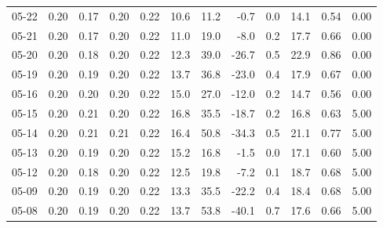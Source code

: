 \begin{threeparttable}
{\begin{tabular}{lrrrrrrrrrrr}
  05-22 &          0.20 &          0.17 &          0.20 &        0.22 &                10.6 &                11.2 &       -0.7 &                 0.0 &             14.1 &            0.54 &                   0.00 \\
  05-21 &          0.20 &          0.17 &          0.20 &        0.22 &                11.0 &                19.0 &       -8.0 &                 0.2 &             17.7 &            0.66 &                   0.00 \\
  05-20 &          0.20 &          0.18 &          0.20 &        0.22 &                12.3 &                39.0 &      -26.7 &                 0.5 &             22.9 &            0.86 &                   0.00 \\
  05-19 &          0.20 &          0.19 &          0.20 &        0.22 &                13.7 &                36.8 &      -23.0 &                 0.4 &             17.9 &            0.67 &                   0.00 \\
  05-16 &          0.20 &          0.20 &          0.20 &        0.22 &                15.0 &                27.0 &      -12.0 &                 0.2 &             14.7 &            0.56 &                   0.00 \\
  05-15 &          0.20 &          0.21 &          0.20 &        0.22 &                16.8 &                35.5 &      -18.7 &                 0.2 &             16.8 &            0.63 &                   5.00 \\
  05-14 &          0.20 &          0.21 &          0.21 &        0.22 &                16.4 &                50.8 &      -34.3 &                 0.5 &             21.1 &            0.77 &                   5.00 \\
  05-13 &          0.20 &          0.19 &          0.20 &        0.22 &                15.2 &                16.8 &       -1.5 &                 0.0 &             17.1 &            0.60 &                   5.00 \\
  05-12 &          0.20 &          0.18 &          0.20 &        0.22 &                12.5 &                19.8 &       -7.2 &                 0.1 &             18.7 &            0.68 &                   5.00 \\
  05-09 &          0.20 &          0.19 &          0.20 &        0.22 &                13.3 &                35.5 &      -22.2 &                 0.4 &             18.4 &            0.68 &                   5.00 \\
  05-08 &          0.20 &          0.19 &          0.20 &        0.22 &                13.7 &                53.8 &      -40.1 &                 0.7 &             17.6 &            0.66 &                   5.00 \\

\end{tabular}}
\end{threeparttable}
